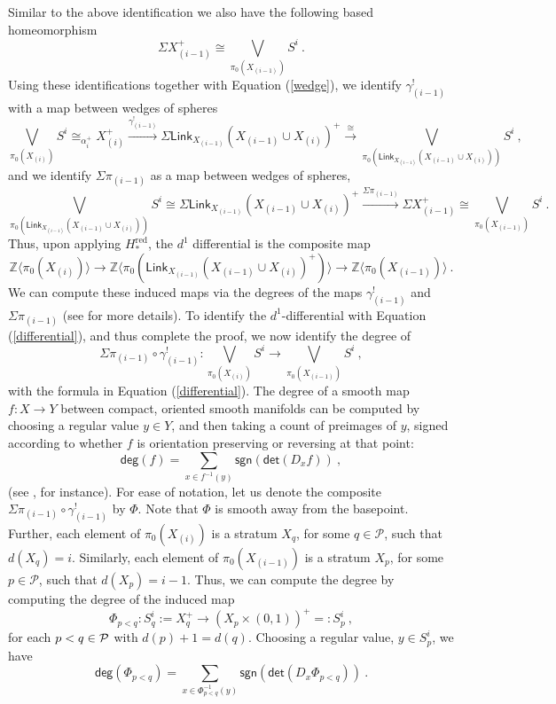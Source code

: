 \documentclass{article}
\newcommand{\bb}[1]{\mathbb{#1}}
\newcommand{\mc}[1]{\mathcal{#1}}
\newcommand{\msf}[1]{\mathsf{#1}}
\newcommand{\link}{\msf{Link}}
\theoremstyle{definition}
\begin{document}
Similar to the above identification we also have the following based homeomorphism
$$\Sigma X_{(i-1)}^+
    \cong \bigvee_{\pi_0(X_{(i-1)})} S^i~.$$
Using these identifications together with Equation (\ref{wedge}), we identify 
$\gamma^!_{(i-1)}$  with a map between wedges of spheres
$$\bigvee_{\pi_0(X_{(i)})} S^i \cong_{\alpha_i^+} X_{(i)}^+ \xrightarrow{\gamma^!_{(i-1)}}
    \Sigma\link_{X_{(i-1)}}(X_{(i-1)} \cup X_{(i)})^+\xrightarrow{\cong}
    \bigvee_{\pi_0(\link_{X_{(i-1)}}(X_{(i-1)} \cup X_{(i)}))} S^i~,$$
and we identify $\Sigma\pi_{(i-1)}$ as a map between wedges of spheres, 
$$\bigvee_{\pi_0(\link_{X_{(i-1)}}(X_{(i-1)} \cup X_{(i)}))} S^i \cong 
    \Sigma\link_{X_{(i-1)}}(X_{(i-1)} \cup X_{(i)})^+ \xrightarrow{\Sigma\pi_{(i-1)}} \Sigma X_{(i-1)}^+
    \cong \bigvee_{\pi_0(X_{(i-1)})} S^i~.$$
Thus, upon applying $H^\text{red}_*$, the $d^1$ differential is the composite map
$$\bb{Z}\langle \pi_0(X_{(i)})\rangle \to 
    \bb{Z}\langle \pi_0(\link_{X_{(i-1)}}(X_{(i-1)}\cup X_{(i)})^+)\rangle \to 
    \bb{Z}\langle \pi_0(X_{(i-1)})\rangle~.$$
We can compute these induced maps via the degrees of the maps $\gamma^!_{(i-1)}$ and $\Sigma\pi_{(i-1)}$
(see \cite{hatcher} for more details). To identify the $d^1$-differential with Equation (\ref{differential}),
and thus complete the proof, we now identify the degree of 
$$\Sigma\pi_{(i-1)} \circ \gamma^!_{(i-1)} : \bigvee_{\pi_0(X_{(i)})} S^i \to
    \bigvee_{\pi_0(X_{(i-1)})} S^i~,$$
with the formula in Equation (\ref{differential}). 
The degree of a smooth map $f:X \to Y$ between compact, oriented smooth manifolds can be computed by 
choosing a regular value $y \in Y$, and then taking a count of preimages of $y$, signed according to whether 
$f$ is orientation preserving or reversing at that point:
$$\msf{deg}(f) = \sum_{x \in f^{-1}(y)} \msf{sgn}\left(\msf{det}(D_x f)\right)~,$$
(see \cite{guillemin}, for instance). 
For ease of notation, 
let us denote the composite $\Sigma\pi_{(i-1)} \circ \gamma^!_{(i-1)}$  by $\Phi$. Note that $\Phi$ is smooth
away from the basepoint. Further, each element of $\pi_0(X_{(i)})$ is a stratum $X_q$, for some $q \in \mc{P}$,
such that $d(X_q) = i$. Similarly, each element of $\pi_0(X_{(i-1)})$ is a stratum $X_p$, for some $p \in \mc{P}$,
such that $d(X_p) = i-1$. Thus, we can compute the degree by computing the degree of the induced map
$$\Phi_{p<q}:S^i_q := X_q^+ \to (X_p \times (0,1))^+=:S^i_p~,$$
for each $p<q \in \mathcal P$ with $d(p)+1=d(q)$. Choosing a regular value, $y \in S^i_p$, we have
$$\msf{deg}(\Phi_{p<q}) = \sum_{x \in \Phi_{p<q}^{-1}(y)} 
    \msf{sgn}\left(\msf{det}(D_x \Phi_{p<q})\right)~.$$
\end{document}
